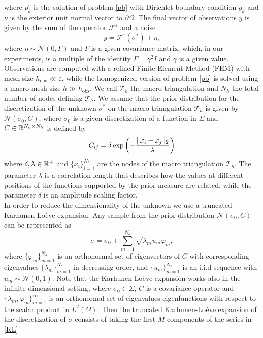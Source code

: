 where $p_k^{\varepsilon}$ is the solution of problem \eqref{pb} with Dirichlet boundary condition $g_k$ and $\nu$ is the exterior unit normal vector to $\partial \Omega$. The final vector of observations $y$ is given by the sum of the operator $\mathcal{F}^{\varepsilon}$ and a noise
\[ y = \mathcal{F}^{\varepsilon}(\sigma^*) + \eta, \]
where $\eta \sim \mathcal{N}(0, \Gamma)$ and $\Gamma$ is a given covariance matrix, which, in our experiments, is a multiple of the identity $\Gamma = \gamma^2 I$ and $\gamma$ is a given value. Observations are computed with a refined Finite Element Method (FEM) with mesh size $h_{\mathrm{obs}} \ll \varepsilon$, while the homogenized version of problem \eqref{pb} is solved using a macro mesh size $h \gg h_{\mathrm{obs}}$. We call $\mathcal{T}_h$ the macro triangulation and $N_h$ the total number of nodes defining $\mathcal{T}_h$. We assume that the prior distribution for the discretization of the unknown $\sigma^*$ on the macro triangulation $\mathcal{T}_h$ is given by $\mathcal{N}(\sigma_0, C)$, where $\sigma_0$ is a given discretization of a function in $\Sigma$ and $C \in \mathbb{R}^{N_h \times N_h}$ is defined by
\begin{equation*}
C_{ij} = \delta \exp \left ( - \frac{\lVert x_i - x_j\rVert_2}{\lambda} \right )
\end{equation*}
where $\delta, \lambda \in \mathbb{R}^+$ and $\{ x_i \}_{i=1}^{N_h}$ are the nodes of the macro triangulation $\mathcal{T}_h$. The parameter $\lambda$ is a correlation length that describes how the values at different positions of the functions supported by the prior measure are related, while the parameter $\delta$ is an amplitude scaling factor. \\
In order to reduce the dimensionality of the unknown we use a truncated Karhunen-Lo\`eve expansion. Any sample from the prior distribution $\mathcal{N}(\sigma_0,C)$ can be represented as
\begin{equation}
\label{KL}
\sigma = \sigma_0 + \sum_{m=1}^{N_h} \sqrt{\lambda_m} u_m \varphi_m,
\end{equation}
where $\{ \varphi_m \}_{m=1}^{N_h}$ is an orthonormal set of eigenvectors of $C$ with corresponding eigenvalues $\{ \lambda_m \}_{m=1}^{N_h}$ in decreasing order, and $\{ u_m \}_{m=1}^{N_h}$ is an i.i.d sequence with $u_m \sim \mathcal{N}(0,1)$. Note that the Karhunen-Lo\`eve expansion works also in the infinite dimensional setting, where $\sigma_0 \in \Sigma$, $C$ is a covariance operator and $\{ \lambda_m, \varphi_m \}_{m=1}^{\infty}$ is an orthonormal set of eigenvalues-eigenfunctions with respect to the scalar product in $L^2(\Omega)$. Then the truncated Karhunen-Lo\`eve expansion of the discretization of $\sigma$ consists of taking the first $M$ components of the series in \eqref{KL}
